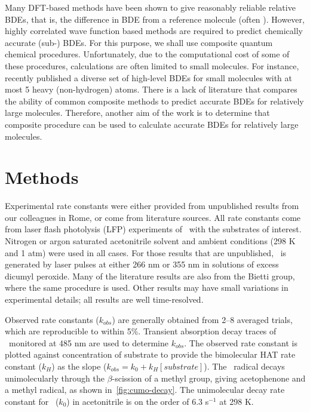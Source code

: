 \begin{doublespace}
Many DFT-based methods have been shown to give reasonably reliable relative
BDEs, that is, the difference in BDE from a reference molecule (often
).\cite{DiLabio1999, Chan2012, Wiberg2014} However, highly correlated
wave function based methods are required to predict chemically accurate
(sub-\kcalmol) BDEs. For this purpose, we shall use composite quantum chemical
procedures. Unfortunately, due to the computational cost of some of these
procedures, calculations are often limited to small molecules. For instance,
\citet{Chan2012} recently published a diverse set of high-level BDEs for small
molecules with at most 5 heavy (non-hydrogen) atoms. There is a lack of
literature that compares the ability of common composite methods to predict
accurate  BDEs for relatively large molecules. Therefore, another aim
of the work is to determine that composite procedure can be used to calculate
accurate BDEs for relatively large molecules.

\section{Methods}\label{sec:hat-methods}

Experimental rate constants were either provided from unpublished results from
our colleagues in Rome, or come from literature sources.\cite{Bietti2010,
Bietti2011, Pischel2001, Salamone2011, Salamone2012, Salamone2012a,
Salamone2013, Salamone2015} All rate constants come from laser flash photolysis
(LFP) experiments of \cumo\ with the substrates of interest. Nitrogen or argon
saturated acetonitrile solvent and ambient conditions (298 K and 1 atm) were
used in all cases. For those results that are unpublished, \cumo\ is generated
by laser pulses at either 266 nm or 355 nm in solutions of excess dicumyl
peroxide. Many of the literature results are also from the Bietti group, where
the same procedure is used. Other results may have small variations in
experimental details; all results are well time-resolved.

Observed rate constants ($k_{obs}$) are generally obtained from 2--8 averaged
trials, which are reproducible to within 5\%. Transient absorption decay traces
of \cumo\ monitored at 485 nm are used to determine $k_{obs}$. The observed
rate constant is plotted against concentration of substrate to provide the
bimolecular HAT rate constant ($k_H$) as the slope ($k_{obs} = k_0 +
k_H[substrate]$). The \cumo\ radical decays unimolecularly through the
$\beta$-scission of a methyl group, giving acetophenone and a methyl radical,
as shown in~\ref{fig:cumo-decay}. The unimolecular decay rate
constant\cite{Avila1993, Avila1995} for \cumo\ ($k_0$) in acetonitrile is on
the order of 6.3  s$^{-1}$ at 298 K.


\end{doublespace}
